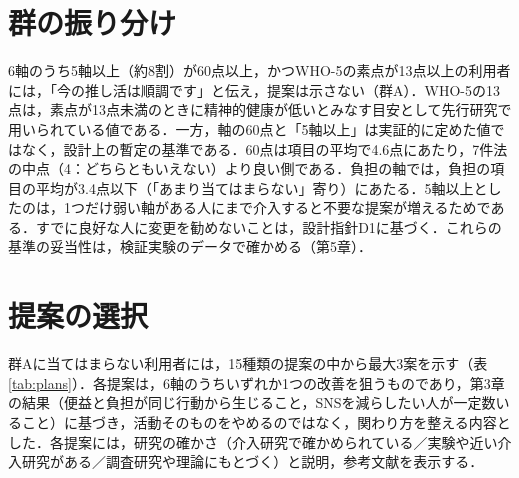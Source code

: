 \section{群の振り分け}
6軸のうち5軸以上（約8割）が60点以上，かつWHO-5の素点が13点以上の利用者には，「今の推し活は順調です」と伝え，提案は示さない（群A）．WHO-5の13点は，素点が13点未満のときに精神的健康が低いとみなす目安として先行研究\cite{topp2015}で用いられている値である．一方，軸の60点と「5軸以上」は実証的に定めた値ではなく，設計上の暫定の基準である．60点は項目の平均で4.6点にあたり，7件法の中点（4：どちらともいえない）より良い側である．負担の軸では，負担の項目の平均が3.4点以下（「あまり当てはまらない」寄り）にあたる．5軸以上としたのは，1つだけ弱い軸がある人にまで介入すると不要な提案が増えるためである．すでに良好な人に変更を勧めないことは，設計指針D1に基づく．これらの基準の妥当性は，検証実験のデータで確かめる（第5章）．

\section{提案の選択}
群Aに当てはまらない利用者には，15種類の提案の中から最大3案を示す（表\ref{tab:plans}）．各提案は，6軸のうちいずれか1つの改善を狙うものであり，第3章の結果（便益と負担が同じ行動から生じること，SNSを減らしたい人が一定数いること）に基づき，活動そのものをやめるのではなく，関わり方を整える内容とした．各提案には，研究の確かさ（介入研究で確かめられている／実験や近い介入研究がある／調査研究や理論にもとづく）と説明，参考文献を表示する．

